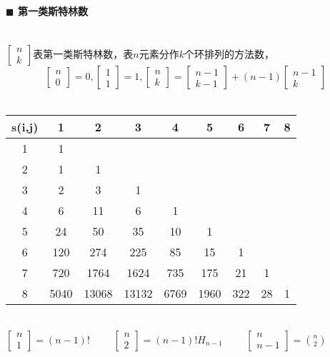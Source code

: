 \paragraph{$\blacksquare$ 第一类斯特林数}
\noindent \\
$\left[\begin{matrix} n \\ k \end{matrix}\right]$表第一类斯特林数，表$n$元素分作$k$个环排列的方法数，$$\left[\begin{matrix} n \\ 0 \end{matrix}\right]=0, \left[\begin{matrix} 1 \\ 1 \end{matrix}\right]=1, \left[\begin{matrix} n \\ k \end{matrix}\right]=\left[\begin{matrix} n-1 \\ k-1 \end{matrix}\right]+(n-1)\left[\begin{matrix} n-1 \\ k \end{matrix}\right]$$\\
\begin{tabular}{|c|c|c|c|c|c|c|c|c|}
\hline s(i,j)&1&2&3&4&5&6&7&8\\
\hline 1&1&&&&&&& \\
\hline 2&1&1&&&&&&\\
\hline 3&2&3&1&&&&&\\
\hline 4&6&11&6&1&&&&\\
\hline 5&24&50&35&10&1&&&\\
\hline 6&120&274&225&85&15&1&&\\
\hline 7&720&1764&1624&735&175&21&1&\\
\hline 8&5040&13068&13132&6769&1960&322&28&1\\
\hline
\end{tabular}\\
$\left[\begin{matrix} n \\ 1 \end{matrix}\right]=(n-1)!$~~~~
$\left[\begin{matrix} n \\ 2 \end{matrix}\right]=(n-1)!H_{n-1}$~~~~
$\left[\begin{matrix} n \\ n-1 \end{matrix}\right]=\binom{n}{2}$~~~~
